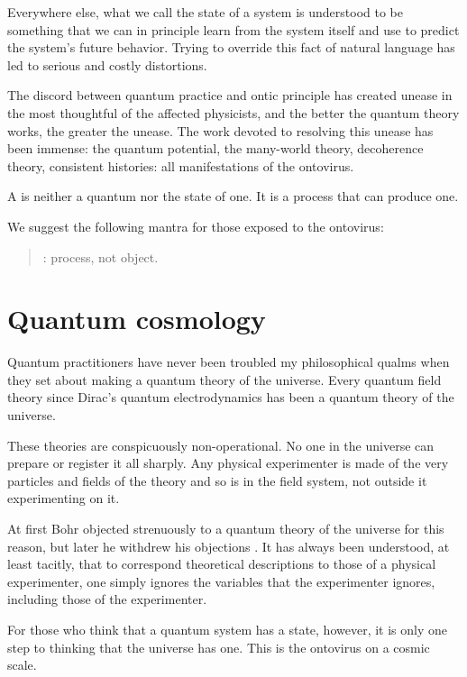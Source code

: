 \documentclass[a4paper,11pt]{article}
\begin{document}
Everywhere else,
what  we call the state of a system 
is understood to be something that we can 
in principle learn  from the system itself
and use to predict
the system's future behavior.
Trying to override  this fact of natural language has
led to serious and costly distortions.

The discord between quantum practice and 
ontic principle has created unease in the most thoughtful of
the affected
physicists,
and 
the better the quantum theory 
works, the greater the unease.
The work devoted to resolving this unease has been immense:
the quantum potential, the many-world theory, 
decoherence theory,
consistent histories:
all 
manifestations  of  the ontovirus.

A \myHighlight{$\psi$}\coordHE{} is neither a quantum nor the state of one.
It is a process that can produce one.

We suggest the following mantra for those exposed to the ontovirus:

\begin{quotation}
\myHighlight{$\psi$}\coordHE{}:  process, not object.
 \end{quotation}


\part{Quantum cosmology}

Quantum practitioners have never been troubled my
philosophical qualms when they set about making a 
quantum theory of the universe.
Every quantum field theory since Dirac's quantum
electrodynamics has been 
a 
quantum theory of the universe.

These theories are conspicuously non-operational.
No one in the universe
can prepare or register it all sharply.
Any physical experimenter is made of the very 
particles and fields of the theory
and so is in the field system,
not outside it experimenting on it.

At first Bohr objected strenuously to a quantum theory
of the universe for this reason, but later he 
withdrew his objections \cite{BOHR}.
It has always been understood,
at least tacitly,
that to correspond theoretical descriptions to those
of a physical experimenter,
one simply ignores the variables that
the experimenter ignores,
including those of the experimenter.

For those who think that a quantum system has a state,
however,
it is only one step to thinking that the universe has one.
This is the ontovirus on a cosmic scale.
\end{document}

